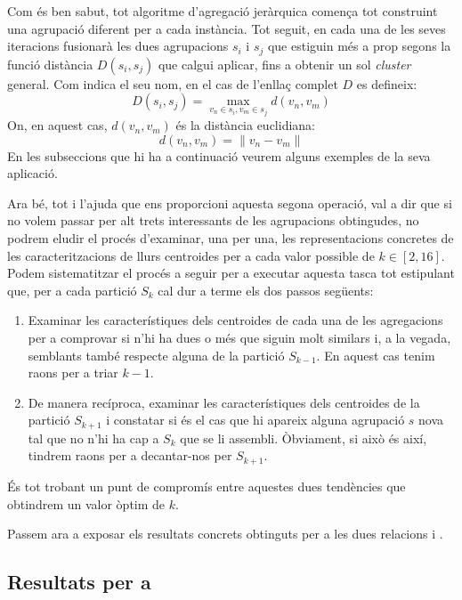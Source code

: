 \documentclass[
	a4paper,
	twoside,
	justified
]{tufte-book}
\begin{document}
Com és ben sabut, tot algoritme d'agregació jeràrquica comença tot construint una agrupació diferent per a cada instància. Tot seguit, en cada una de les seves iteracions fusionarà les dues agrupacions $s_i$ i $s_j$ que estiguin més a prop segons la funció distància $D(s_i, s_j)$ que calgui aplicar, fins a obtenir un sol \emph{cluster} general. Com indica el seu nom, en el cas de l'enllaç complet $D$ es defineix:
$$
	D(s_i, s_j) = \max_{v_n \in s_i, v_m \in s_j} d(v_n,v_m)
$$     
On, en aquest cas, $d(v_n, v_m)$ és la distància euclidiana:
$$
	d(v_n,v_m) = \| v_n - v_m \|	
$$
En les subseccions que hi ha a continuació veurem alguns exemples de la seva aplicació.

Ara bé, tot i l'ajuda que ens proporcioni aquesta segona operació, val a dir que si no volem passar per alt trets interessants de les agrupacions obtingudes, no podrem eludir el procés d'examinar, una per una, les representacions concretes de les caracteritzacions de llurs centroides per a cada valor possible de $k \in [2, 16]$. Podem  sistematitzar el procés a seguir per a executar aquesta tasca tot estipulant que, per a cada partició $S_k$ cal dur a terme els dos passos següents:

\begin{enumerate}[(1)]

\item Examinar les característiques dels centroides de cada una de les agregacions per a comprovar si n'hi ha dues o més que siguin molt similars i, a la vegada, semblants també respecte alguna de la partició $S_{k-1}$. En aquest cas tenim raons per a triar $k-1$.

\item De manera recíproca, examinar les característiques dels centroides de la partició $S_{k+1}$ i constatar si és el cas que hi apareix alguna agrupació $s$ nova tal que no n'hi ha cap a $S_k$ que se li assembli. Òbviament, si això és així, tindrem raons per a decantar-nos per $S_{k+1}$.   

\end{enumerate}

És tot trobant un punt de compromís entre aquestes dues tendències que obtindrem un valor òptim de $k$.

Passem ara a exposar els resultats concrets obtinguts per a les dues relacions  i . 

\subsection{Resultats per a \emph{}}
\end{document}
